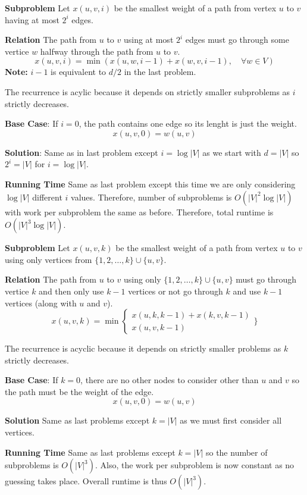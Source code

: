 \documentclass[12pt,twoside]{article}
\begin{document}
\begin{problems}
\begin{problemparts}
\problempart %

{\bf Subproblem} Let $x(u, v, i)$ be the smallest weight of a path from
vertex $u$ to $v$ having at most $2^i$ edges.

{\bf Relation} The path from $u$ to $v$ using at most $2^i$ edges must go
through some vertice $w$ halfway through the path from $u$ to $v$.
$$ x(u, v, i) = \min(x(u, w, i - 1) + x(w, v, i - 1),\quad \forall w \in V) $$
{\bf Note:} $i - 1$ is equivalent to $d / 2$ in the last problem.

The recurrence is acylic because it depends on strictly smaller subproblems
as $i$ strictly decreases.

{\bf Base Case}: If $i = 0$, the path contains one edge so its lenght is just
the weight.
$$ x(u, v, 0) = w(u, v) $$

{\bf Solution}: Same as in last problem except $i = \log |V|$ as we start
with $d = |V|$ so $2^i = |V|$ for $i = \log |V|$.

{\bf Running Time} Same as last problem except this time we are only
considering $\log |V|$ different $i$ values. Therefore, number of subproblems
is $O(|V|^2 \log |V|)$ with work per subproblem the same as before.
Therefore, total runtime is $O(|V|^3 \log |V|)$.

\problempart %

{\bf Subproblem} Let $x(u, v, k)$ be the smallest weight of a path from
vertex $u$ to $v$ using only vertices from $\{1, 2, \ldots, k\} \cup \{u,
v\}$.

{\bf Relation} The path from $u$ to $v$ using only $\{1, 2, \ldots, k\} \cup
\{u, v\}$ must go through vertice $k$ and then only use $k-1$ vertices or not
go through $k$ and use $k-1$ vertices (along with $u$ and $v$).
$$ x(u, v, k) = \min\begin{cases}
  x(u, k, k - 1) + x(k, v, k - 1) \\
  x(u, v, k - 1)
\end{cases}\Bigg\} $$

The recurrence is acyclic because it depends on strictly smaller problems as
$k$ strictly decreases.

{\bf Base Case}: If $k = 0$, there are no other nodes to consider other than
$u$ and $v$ so the path must be the weight of the edge.
$$ x(u, v, 0) = w(u, v) $$

{\bf Solution} Same as last problems except $k = |V|$ as we must first
consider all vertices.

{\bf Running Time} Same as last problems except $k = |V|$ so the number of
subproblems is $O(|V|^3)$. Also, the work per subproblem is now constant as
no guessing takes place. Overall runtime is thus $O(|V|^3)$.


\end{problemparts}
\end{problems}
\end{document}
